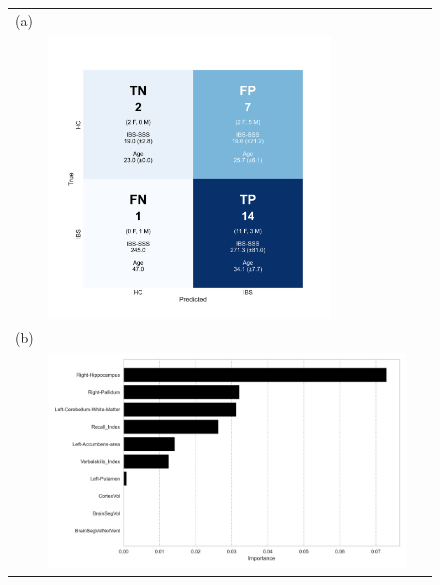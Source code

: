 \documentclass[diagnostics,article,accept,pdftex,moreauthors]{Definitions/mdpi}
\begin{document}
\begin{figure}[H]

\begin{tabular}{ll}
(a) &   \\
  & \includegraphics[width=0.750\textwidth]{figs/annotated_xgboost_confusion_matrix_using_ASEG_and_RBANS.png} \\
(b) &  \\
   &  \includegraphics[width=0.95\textwidth]{figs/Top_10_Feature_Importances_permutation_importance_aseg_and_rbans.png}\\
\end{tabular}

\end{figure}
\end{document}
